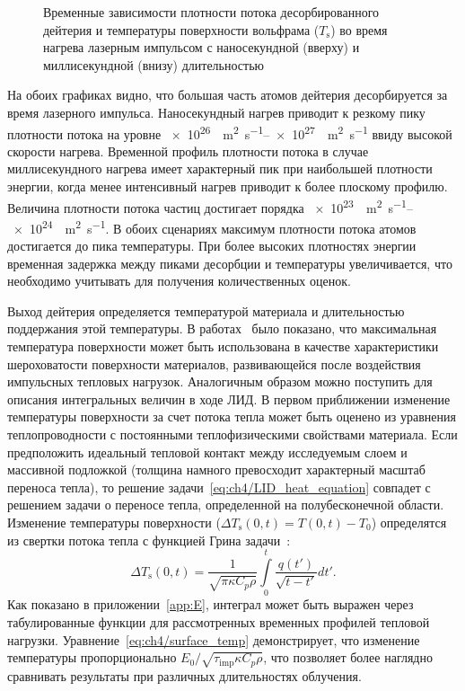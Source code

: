 \begin{figure}[ht]
    \caption{Временные зависимости плотности потока десорбированного дейтерия и температуры поверхности вольфрама ($T_\mathrm{s}$) во время нагрева лазерным импульсом с наносекундной (вверху) и миллисекундной (внизу) длительностью}\label{fig:ch4/LID_flux}
\end{figure}

На обоих графиках видно, что большая часть атомов дейтерия десорбируется за время лазерного импульса. Наносекундный нагрев приводит к резкому пику плотности потока на уровне \SIrange{e26}{e27}{\per\meter\squared\per\second} ввиду высокой скорости нагрева. Временной профиль плотности потока в случае миллисекундного нагрева имеет характерный пик при наибольшей плотности энергии, когда менее интенсивный нагрев приводит к более плоскому профилю. Величина плотности потока частиц достигает порядка \SIrange{e23}{e24}{\per\meter\squared\per\second}. В обоих сценариях максимум плотности потока атомов достигается до пика температуры. При более высоких плотностях энергии временная задержка между пиками десорбции и температуры увеличивается, что необходимо учитывать для получения количественных оценок.

Выход дейтерия определяется температурой материала и длительностью поддержания этой температуры. В работах~\cite{VanEden2014,Yu2015} было показано, что максимальная температура поверхности может быть использована в качестве характеристики шероховатости поверхности материалов, развивающейся после воздействия импульсных тепловых нагрузок. Аналогичным образом можно поступить для описания интегральных величин в ходе ЛИД. В первом приближении изменение температуры поверхности за счет потока тепла может быть оценено из уравнения теплопроводности с постоянными теплофизическими свойствами материала. Если предположить идеальный тепловой контакт между исследуемым слоем и массивной подложкой (толщина намного превосходит характерный масштаб переноса тепла), то решение задачи~\cref{eq:ch4/LID_heat_equation} совпадет с решением задачи о переносе тепла, определенной на полубесконечной области. Изменение температуры поверхности (\( \Delta T_\mathrm{s}(0,t) = T(0,t)-T_0\)) определятся из свертки потока тепла с функцией Грина задачи~\cite{Bechtel1975}:
\begin{equation}
    \label{eq:ch4/surface_temp}
    \Delta T_\mathrm{s}(0,t) = \frac{1}{\sqrt{\pi \kappa C_p \rho}} \int\limits_0^t \frac{q(t')}{\sqrt{t-t'}}dt'.
\end{equation}
Как показано в приложении~\cref{app:E}, интеграл может быть выражен через табулированные функции для рассмотренных временных профилей тепловой нагрузки. Уравнение~\cref{eq:ch4/surface_temp} демонстрирует, что изменение температуры пропорционально \( E_0 /\sqrt{\tau_\mathrm{imp}\kappa C_p \rho} \), что позволяет более наглядно сравнивать результаты при различных длительностях облучения.

